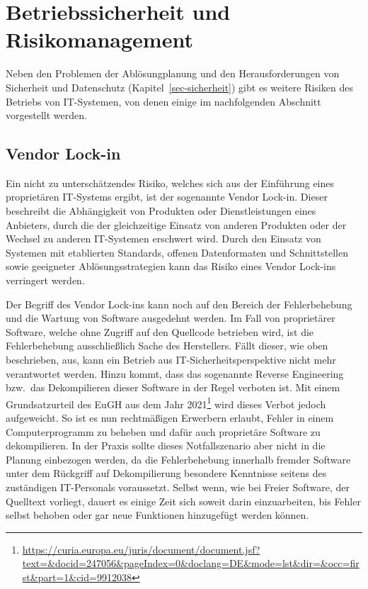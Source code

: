 \documentclass[
  11pt,
  letterpaper,
  DIV=11,
  twoside]{scrreprt}
\DeclareRobustCommand{\href}[2]{#2\footnote{\url{#1}}}
\begin{document}
\section{Betriebssicherheit und
Risikomanagement}\label{betriebssicherheit-und-risikomanagement}

Neben den Problemen der Ablösungplanung und den Herausforderungen von
Sicherheit und Datenschutz (Kapitel~\ref{sec-sicherheit}) gibt es
weitere Risiken des Betriebs von IT-Systemen, von denen einige im
nachfolgenden Abschnitt vorgestellt werden.

\subsection{Vendor Lock-in}\label{vendor-lock-in}

Ein nicht zu unterschätzendes Risiko, welches sich aus der Einführung
eines proprietären IT-Systems ergibt, ist der sogenannte Vendor Lock-in.
Dieser beschreibt die Abhängigkeit von Produkten oder Dienstleistungen
eines Anbieters, durch die der gleichzeitige Einsatz von anderen
Produkten oder der Wechsel zu anderen IT-Systemen erschwert wird. Durch
den Einsatz von Systemen mit etablierten Standards, offenen
Datenformaten und Schnittstellen sowie geeigneter Ablösungsstrategien
kann das Risiko eines Vendor Lock-ins verringert werden.

Der Begriff des Vendor Lock-ins kann noch auf den Bereich der
Fehlerbehebung und die Wartung von Software ausgedehnt werden. Im Fall
von proprietärer Software, welche ohne Zugriff auf den Quellcode
betrieben wird, ist die Fehlerbehebung ausschließlich Sache des
Herstellers. Fällt dieser, wie oben beschrieben, aus, kann ein Betrieb
aus IT-Sicherheitsperspektive nicht mehr verantwortet werden. Hinzu
kommt, dass das sogenannte Reverse Engineering bzw.~das Dekompilieren
dieser Software in der Regel verboten ist. Mit einem
\href{https://curia.europa.eu/juris/document/document.jsf?text=&docid=247056&pageIndex=0&doclang=DE&mode=lst&dir=&occ=first&part=1&cid=9912038}{Grundsatzurteil
des EuGH aus dem Jahr 2021} wird dieses Verbot jedoch aufgeweicht. So
ist es nun rechtmäßigen Erwerbern erlaubt, Fehler in einem
Computerprogramm zu beheben und dafür auch proprietäre Software zu
dekompilieren. In der Praxis sollte dieses Notfallszenario aber nicht in
die Planung einbezogen werden, da die Fehlerbehebung innerhalb fremder
Software unter dem Rückgriff auf Dekompilierung besondere Kenntnisse
seitens des zuständigen IT-Personals voraussetzt. Selbst wenn, wie bei
Freier Software, der Quelltext vorliegt, dauert es einige Zeit sich
soweit darin einzuarbeiten, bis Fehler selbst behoben oder gar neue
Funktionen hinzugefügt werden können.
\end{document}
